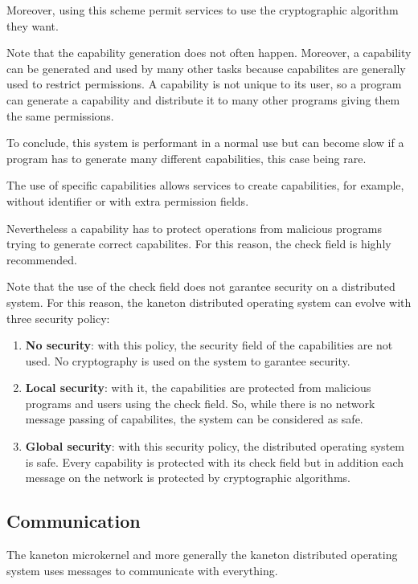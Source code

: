\begin{multicols}{2}
Moreover, using this scheme permit services to use the cryptographic algorithm
they want.

Note that the capability generation does not often happen. Moreover,
a capability can be generated and used by many other tasks because
capabilites are generally used to restrict permissions. A capability
is not unique to its user, so a program can generate a capability and
distribute it to many other programs giving them the same permissions.

To conclude, this system is performant in a normal use but can become
slow if a program has to generate many different capabilities, this case
being rare.

The use of specific capabilities allows services to create capabilities,
for example, without identifier or with extra permission fields.

Nevertheless a capability has to protect operations from malicious programs
trying to generate correct capabilites. For this reason, the check field is
highly recommended.

Note that the use of the check field does not garantee security on a
distributed system. For this reason, the kaneton distributed operating
system can evolve with three security policy:

\begin{enumerate}

\item \textbf{No security}: with this policy, the security field of the
      capabilities are not used. No cryptography is used on the system
      to garantee security.
\item \textbf{Local security}: with it, the capabilities are protected from
      malicious programs and users using the check field. So, while there
      is no network message passing of capabilites, the system can be
      considered as safe.
\item \textbf{Global security}: with this security policy, the distributed
      operating system is safe. Every capability is protected with its check
      field but in addition each message on the network is protected by
      cryptographic algorithms.

\end{enumerate}

\subsection{Communication}

The kaneton microkernel and more generally the kaneton distributed operating
system uses messages to communicate with everything.


\end{multicols}
